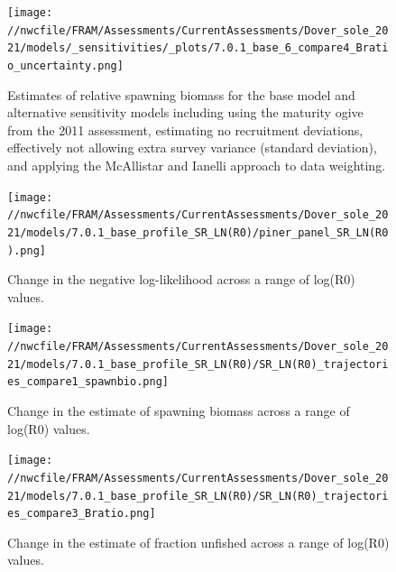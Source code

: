 \documentclass[11pt,
  english,
  a4paper,
]{article}
\begin{document}
\begin{figure}
\centering
\texttt{[image: //nwcfile/FRAM/Assessments/CurrentAssessments/Dover\_sole\_2021/models/\_sensitivities/\_plots/7.0.1\_base\_6\_compare4\_Bratio\_uncertainty.png]}
\caption{Estimates of relative spawning biomass for the base model and alternative sensitivity models including using the maturity ogive from the 2011 assessment, estimating no recruitment deviations, effectively not allowing extra survey variance (standard deviation), and applying the McAllistar and Ianelli approach to data weighting.\label{fig:sens-biodata-relssb}}
\end{figure}

\tagmcend\tagstructend


\begin{figure}
\centering
\texttt{[image: //nwcfile/FRAM/Assessments/CurrentAssessments/Dover\_sole\_2021/models/7.0.1\_base\_profile\_SR\_LN(R0)/piner\_panel\_SR\_LN(R0).png]}
\caption{Change in the negative log-likelihood across a range of log(R0) values.\label{fig:r0-profile}}
\end{figure}

\tagmcend\tagstructend


\begin{figure}
\centering
\texttt{[image: //nwcfile/FRAM/Assessments/CurrentAssessments/Dover\_sole\_2021/models/7.0.1\_base\_profile\_SR\_LN(R0)/SR\_LN(R0)\_trajectories\_compare1\_spawnbio.png]}
\caption{Change in the estimate of spawning biomass across a range of log(R0) values.\label{fig:r0-ssb}}
\end{figure}

\tagmcend\tagstructend


\begin{figure}
\centering
\texttt{[image: //nwcfile/FRAM/Assessments/CurrentAssessments/Dover\_sole\_2021/models/7.0.1\_base\_profile\_SR\_LN(R0)/SR\_LN(R0)\_trajectories\_compare3\_Bratio.png]}
\caption{Change in the estimate of fraction unfished across a range of log(R0) values.\label{fig:r0-depl}}
\end{figure}
\end{document}
